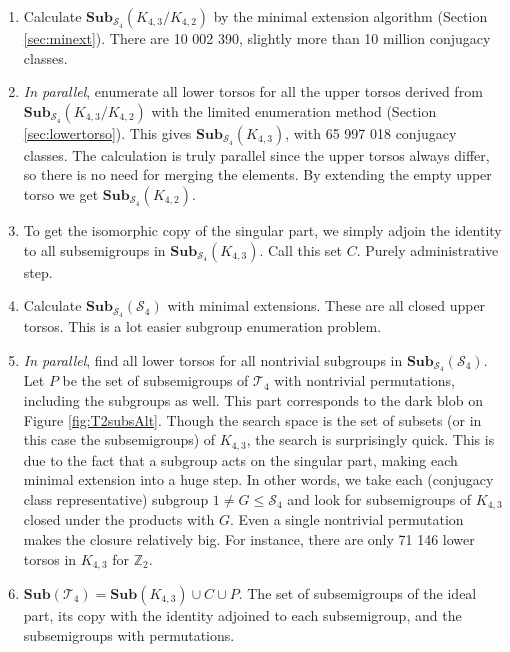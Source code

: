 \documentclass{amsart}
\newcommand{\cT}{{\mathcal T}}
\newcommand{\cS}{{\mathcal S}}
\newcommand{\Sub}{\mathbf{Sub}}
\theoremstyle{plain}
\theoremstyle{definition}
\begin{document}
\begin{enumerate}
\item Calculate $\Sub_{\cS_4}(K_{4,3}/K_{4,2})$ by the minimal extension algorithm (Section \ref{sec:minext}). There are 10 002 390, slightly more than 10 million conjugacy classes.  
\item \emph{In parallel}, enumerate all lower torsos for all the upper torsos derived from  $\Sub_{\cS_4}(K_{4,3}/K_{4,2})$ with the limited enumeration method (Section \ref{sec:lowertorso}). This gives $\Sub_{\cS_4}(K_{4,3})$, with  65 997 018 conjugacy classes. The calculation is truly parallel since the upper torsos always differ, so there is no need for merging the elements. By extending the empty upper torso we get $\Sub_{\cS_4}(K_{4,2})$.
\item To get the isomorphic copy of the singular part, we simply adjoin the identity to all subsemigroups in $\Sub_{\cS_4}(K_{4,3})$. Call this set $C$.
Purely administrative step.
\item Calculate $\Sub_{\cS_4}(\cS_4)$ with minimal extensions. These are all closed upper torsos. This is a lot easier subgroup enumeration problem.
\item \emph{In parallel}, find all lower torsos for all nontrivial subgroups in $\Sub_{\cS_4}(\cS_4)$. Let $P$ be the set of subsemigroups of $\cT_4$ with nontrivial permutations, including the subgroups as well. This part corresponds to the dark blob on Figure \ref{fig:T2subsAlt}.
Though the search space is the set of subsets (or in this case the subsemigroups) of $K_{4,3}$, the search is surprisingly quick.
This is due to the fact that a subgroup acts on the singular part, making each minimal extension into a huge step.
In other words, we take each (conjugacy class representative) subgroup $1\neq G\leq \cS_4$ and look for subsemigroups of $K_{4,3}$ closed under the products with $G$.
Even a single nontrivial permutation makes the closure relatively big.
For instance, there are only 71 146 lower torsos in $K_{4,3}$ for $\mathbb{Z}_2$.
\item $\Sub(\cT_4)=\Sub(K_{4,3})\cup C \cup P$. The set of subsemigroups of the ideal part, its copy with the identity adjoined to each subsemigroup, and the subsemigroups with permutations.
\end{enumerate}
\end{document}

